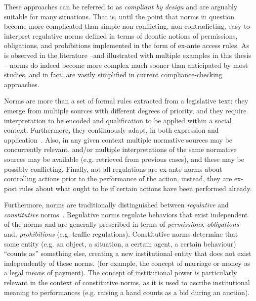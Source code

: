 These approaches can be referred to as \textit{compliant by design} and are arguably suitable for many situations. That is, until the point that norms in question become more complicated than simple non-conflicting, non-contradicting, easy-to-interpret regulative norms defined in terms of deontic notions of permissions, obligations, and prohibitions implemented in the form of ex-ante access rules. As is observed in the literature --and illustrated with multiple examples in this thesis -- norms do indeed become more complex much sooner than anticipated by most studies, and in fact, are vastly simplified in current compliance-checking approaches. 


Norms are more than a set of formal rules extracted from a legislative text: they emerge from multiple sources with different degrees of priority, and they require interpretation to be encoded and qualification to be applied within a social context. Furthermore, they continuously adapt, in both expression and application~\cite{Boella2014APractice}. Also, in any given context multiple normative sources may be concurrently relevant, and/or multiple interpretations of the same normative sources may be available (e.g. retrieved from previous cases), and these may be possibly conflicting. Finally, not all regulations are ex-ante norms about controlling actions prior to the performance of the action, instead, they are ex-post rules about what ought to be if certain actions have been performed already.%


Furthermore, norms are traditionally distinguished between \textit{regulative} and \textit{constitutive} norms~\cite{Searle1969,Boella2004RegulativeSystems,Sileno2015}. Regulative norms regulate behaviors that exist independent of the norms and are generally prescribed in terms of \textit{permissions}, \textit{obligations} and, \textit{prohibitions} (e.g. traffic regulations). Constitutive norms determine that some entity (e.g. an object, a situation, a certain agent, a certain behaviour) ``counts as'' something else, creating a new institutional entity that does not exist independently of these norms. (for example, the concept of marriage or money as a legal means of payment). The concept of institutional power is particularly relevant in the context of constitutive norms, as it is used to ascribe institutional meaning to performances (e.g. raising a hand counts as a bid during an auction).

